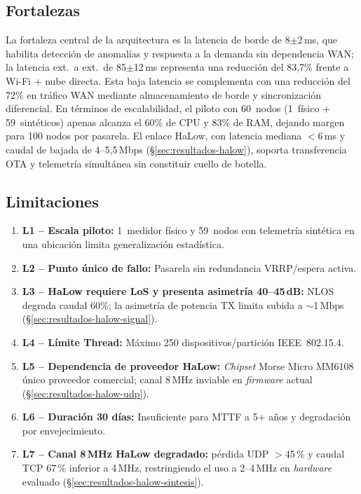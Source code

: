 \subsection{Fortalezas}
\label{sec:resultados-discusion-fortalezas}

La fortaleza central de la arquitectura es la latencia de borde de 8$\pm$2\,ms, que habilita detección de anomalías y respuesta a la demanda sin dependencia WAN; la latencia ext.\ a ext.\ de 85$\pm$12\,ms representa una reducción del 83,7\% frente a Wi-Fi + nube directa. Esta baja latencia se complementa con una reducción del 72\% en tráfico WAN mediante almacenamiento de borde y sincronización diferencial. En términos de escalabilidad, el piloto con 60~nodos (1~físico + 59~sintéticos) apenas alcanza el 60\% de CPU y 83\% de RAM, dejando margen para 100 nodos por pasarela. El enlace HaLow, con latencia mediana $<$6\,ms y caudal de bajada de 4--5,5\,Mbps (§\ref{sec:resultados-halow}), soporta transferencia OTA y telemetría simultánea sin constituir cuello de botella.

\subsection{Limitaciones}
\label{sec:resultados-discusion-limitaciones}

\begin{enumerate}
    \item \textbf{L1 -- Escala piloto:} 1~medidor físico y 59~nodos con telemetría sintética en una ubicación limita generalización estadística.
    \item \textbf{L2 -- Punto único de fallo:} Pasarela sin redundancia VRRP/espera activa.
    \item \textbf{L3 -- HaLow requiere LoS y presenta asimetr\'{i}a 40--45\,dB:} NLOS degrada caudal 60\%; la asimetr\'{i}a de potencia TX limita subida a $\sim$1\,Mbps (§\ref{sec:resultados-halow-signal}).
    \item \textbf{L4 -- Límite Thread:} Máximo 250 dispositivos/partición IEEE~802.15.4.
    \item \textbf{L5 -- Dependencia de proveedor HaLow:} \emph{Chipset} Morse Micro MM6108 \'{u}nico proveedor comercial; canal 8\,MHz inviable en \emph{firmware} actual (§\ref{sec:resultados-halow-udp}).
    \item \textbf{L6 -- Duración 30 días:} Insuficiente para MTTF a 5+ años y degradación por envejecimiento.
    \item \textbf{L7 -- Canal 8\,MHz HaLow degradado:} p\'{e}rdida UDP $>$45\,\% y caudal TCP 67\,\% inferior a 4\,MHz, restringiendo el uso a 2--4\,MHz en \emph{hardware} evaluado (§\ref{sec:resultados-halow-sintesis}).
\end{enumerate}

